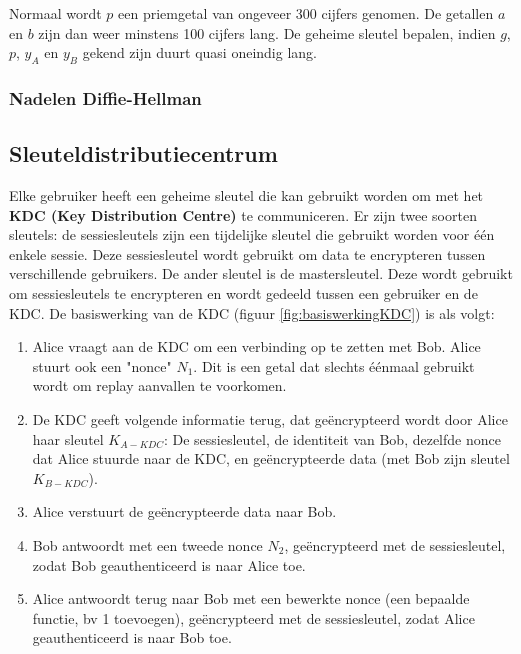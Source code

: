 \documentclass{report}
\begin{document}
	 Normaal wordt $p$ een priemgetal van ongeveer 300 cijfers genomen. De getallen $a$ en $b$ zijn dan weer minstens 100 cijfers lang. De geheime sleutel bepalen, indien $g$, $p$, $y_A$ en $y_B$ gekend zijn duurt quasi oneindig lang. 

	\subsubsection{Nadelen Diffie-Hellman}

	\subsection{Sleuteldistributiecentrum}
	Elke gebruiker heeft een geheime sleutel die kan gebruikt worden om met het \textbf{KDC (Key Distribution Centre)} te communiceren. Er zijn twee soorten sleutels: de sessiesleutels zijn een tijdelijke sleutel die gebruikt worden voor één enkele sessie. Deze sessiesleutel wordt gebruikt om data te encrypteren tussen verschillende gebruikers. De ander sleutel is de mastersleutel. Deze wordt gebruikt om sessiesleutels te encrypteren en wordt gedeeld tussen een gebruiker en de KDC. De basiswerking van de KDC (figuur \ref{fig:basiswerkingKDC}) is als volgt:
	\begin{enumerate}
		\item Alice vraagt aan de KDC om een verbinding op te zetten met Bob. Alice stuurt ook een "nonce" $N_1$. Dit is een getal dat slechts éénmaal gebruikt wordt om replay aanvallen te voorkomen.
		\item De KDC geeft volgende informatie terug, dat geëncrypteerd wordt door Alice haar sleutel $K_{A-KDC}$: De sessiesleutel, de identiteit van Bob, dezelfde nonce dat Alice stuurde naar de KDC, en geëncrypteerde data (met Bob zijn sleutel $K_{B-KDC}$).
		\item Alice verstuurt de geëncrypteerde data naar Bob.
		\item Bob antwoordt met een tweede nonce $N_2$, geëncrypteerd met de sessiesleutel, zodat Bob geauthenticeerd is naar Alice toe.
		\item Alice antwoordt terug naar Bob met een bewerkte nonce (een bepaalde functie, bv 1 toevoegen), geëncrypteerd met de sessiesleutel, zodat Alice geauthenticeerd is naar Bob toe.
	\end{enumerate}
\end{document}
